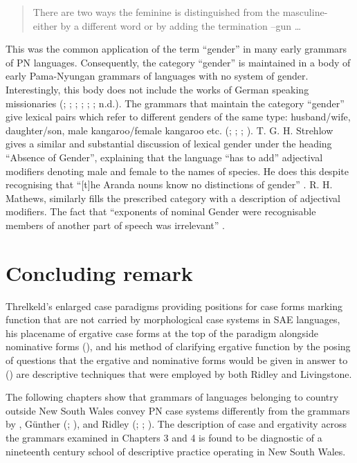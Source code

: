\begin{quote}
    There are two ways the feminine is distinguished from the masculine- either by a different word or by adding the termination –gun … \citep[6]{livingstone_grammar_1892}
\end{quote}

This was the common application of the term “gender” in many early grammars of PN languages. Consequently, the category “gender” is maintained in a body of early Pama-Nyungan grammars of languages with no system of gender. Interestingly, this body does not include the works of German speaking missionaries (\citealt{teichelmann_outlines_1840}; \citealt{meyer_vocabulary_1843}; \citealt{schurmann_letter_1844}; \citealt{kempe_galtjintana-pepa_1891}; \citealt{gunther_grammar_1892}; \citealt{strehlow_einige_1908}; n.d.). The grammars that maintain the category “gender” give lexical pairs which refer to different genders of the same type: husband/wife, daughter/son, male kangaroo/female kangaroo etc. (\citealt[10]{threlkeld_australian_1834}; \citealt[6]{livingstone_grammar_1892}; \citealt[15]{roth_ethnological_1897}; \citealt[324]{mathews_languages_1907}).
T. G. H. Strehlow gives a similar and substantial discussion of lexical gender under the heading ``Absence of Gender'', explaining that the language “has to add” adjectival modifiers denoting male and female to the names of species. He does this despite recognising that “[t]he Aranda nouns know no distinctions of gender” \citep[59]{strehlow_aranda_1944}. R. H. Mathews, similarly fills the prescribed category with a description of adjectival modifiers. The fact that “exponents of nominal Gender were recognisable members of another part of speech was irrelevant” \citep[192]{koch_r_2008}.

\section{Concluding remark}
\label{sec:key:4.7}

Threlkeld’s enlarged case paradigms providing positions for case forms marking function that are not carried by morphological case systems in SAE languages, his placename of ergative case forms at the top of the paradigm alongside nominative forms (), and his method of clarifying ergative function by the posing of questions that the ergative and nominative forms would be given in answer to () are descriptive techniques that were employed by both Ridley and Livingstone.

The following chapters show that grammars of languages belonging to country outside New South Wales convey PN case systems differently from the grammars by \citet{threlkeld_australian_1834}, Günther (\citeyear{gunther_native_1838}; \citeyear{gunther_lecture_1840}), and Ridley (\citeyear{ridley_kamilaroi_1875}; \citeyear{ridley_kamilaroi_1855-1}; \citeyear{ridley_kamilaroi_1856}). The description of case and ergativity across the grammars examined in Chapters 3 and 4 is found to be diagnostic of a nineteenth century school of descriptive practice operating in New South Wales.
